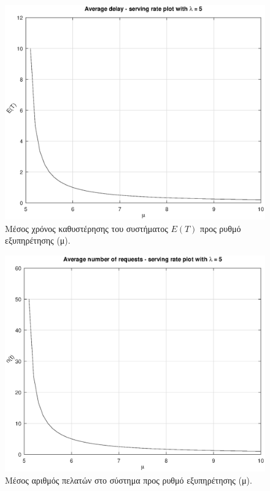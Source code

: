\documentclass {article}
\begin{document}
\begin{figure}[ht]
	\includegraphics[width=\linewidth]{M-M-1_AvgDlay_SrvRate}
	\caption{Μέσος χρόνος καθυστέρησης του συστήματος $E(T)$ προς ρυθμό εξυπηρέτησης (μ).}
	\label{fig:delay}
\end{figure}

\begin{figure}[ht]
	\includegraphics[width=\linewidth]{M-M-1_AvgRqsts_SrvRate}
	\caption{Μέσος αριθμός πελατών στο σύστημα προς ρυθμό εξυπηρέτησης (μ).}
	\label{fig:requests}
\end{figure}
\end{document}
